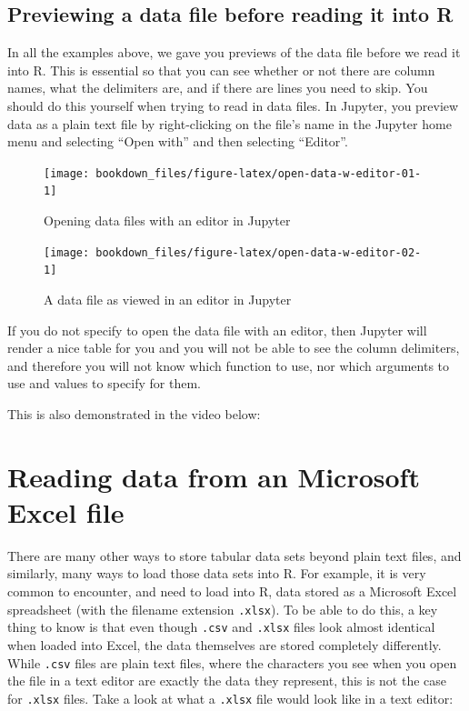 \documentclass[
]{krantz}
\begin{document}
\hypertarget{previewing-a-data-file-before-reading-it-into-r}{%
\subsection{Previewing a data file before reading it into R}\label{previewing-a-data-file-before-reading-it-into-r}}

In all the examples above, we gave you previews of the data file before we read it into R. This is essential so that you can see whether or not there are column names, what the
delimiters are, and if there are lines you need to skip. You should do this yourself when trying to read in data files. In Jupyter, you preview data as a plain text file by right-clicking
on the file's name in the Jupyter home menu and selecting ``Open with'' and then selecting ``Editor''.

\begin{figure}
\texttt{[image: bookdown\_files/figure-latex/open-data-w-editor-01-1]} \caption{Opening data files with an editor in Jupyter}\label{fig:open-data-w-editor-01}
\end{figure}

\begin{figure}
\texttt{[image: bookdown\_files/figure-latex/open-data-w-editor-02-1]} \caption{A data file as viewed in an editor in Jupyter}\label{fig:open-data-w-editor-02}
\end{figure}

If you do not specify to open the data file with an editor, then Jupyter will
render a nice table for you and you will not be able to see the column
delimiters, and therefore you will not know which function to use, nor
which arguments to use and values to specify for them.

This is also demonstrated in the video below:

\hypertarget{reading-data-from-an-microsoft-excel-file}{%
\section{Reading data from an Microsoft Excel file}\label{reading-data-from-an-microsoft-excel-file}}

There are many other ways to store tabular data sets beyond plain text files, and similarly, many ways to load those data sets into R. For example, it is very common to encounter,
and need to load into R, data stored as a Microsoft Excel spreadsheet (with the filename extension \texttt{.xlsx}).
To be able to do this, a key thing to know is that even though \texttt{.csv} and \texttt{.xlsx} files look almost
identical when loaded into Excel, the data themselves are stored completely differently.
While \texttt{.csv} files are plain text files, where the characters you see when you open the file in a text editor are exactly the data they represent,
this is not the case for \texttt{.xlsx} files. Take a look at what a \texttt{.xlsx} file would look like in a text editor:
\end{document}
